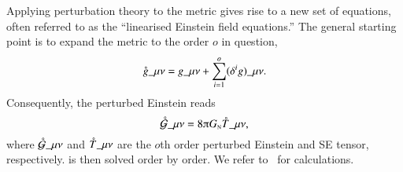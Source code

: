 {

\newcommand{\pert}{\ALIASpert}           %




Applying perturbation theory to the metric gives rise to a new set of equations, often referred to as the ``linearised Einstein field equations.'' The general starting point is to expand the metric to the order $o$ in question,
\begin{equation}
    \pert{g}\_{\mu\nu} = g\_{\mu\nu}+ \sum_{i=1}^{o} (\delta^{i}g)\_{\mu\nu}.
\end{equation}
Consequently, the perturbed Einstein reads
\begin{equation}\label{eq:GR:einstein:linearised_Einstein_eq}
    \pert{\mathcal{G}}\_{\mu\nu} = 8\ppi G\nped{N} \pert{T}\_{\mu\nu},
\end{equation}
where $\pert{\mathcal{G}}\_{\mu\nu}$ and $\pert{T}\_{\mu\nu}$ are the $o$th order perturbed Einstein and SE tensor, respectively.  is then solved order by order. We refer to~\citet{jokelaGravitationalWaveMemory2022,maggioreGravitationalWavesVol2007,carrollSpacetimeGeometryIntroduction2019} for calculations. 

}
